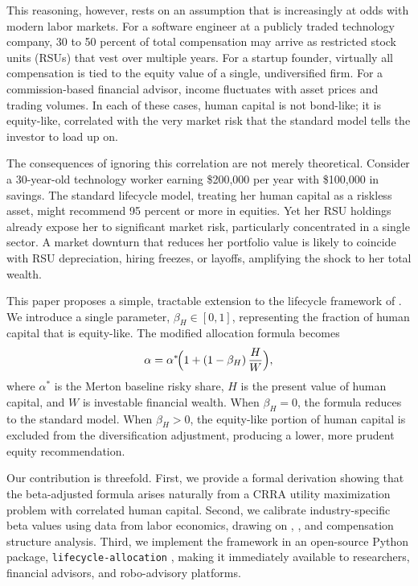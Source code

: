 \documentclass[11pt]{article}
\begin{document}
This reasoning, however, rests on an assumption that is increasingly at
odds with modern labor markets. For a software engineer at a publicly
traded technology company, 30 to 50 percent of total compensation may
arrive as restricted stock units (RSUs) that vest over multiple years. For
a startup founder, virtually all compensation is tied to the equity value
of a single, undiversified firm. For a commission-based financial advisor,
income fluctuates with asset prices and trading volumes. In each of these
cases, human capital is not bond-like; it is equity-like, correlated with
the very market risk that the standard model tells the investor to load up
on.

The consequences of ignoring this correlation are not merely theoretical.
Consider a 30-year-old technology worker earning \$200{,}000 per year with
\$100{,}000 in savings. The standard lifecycle model, treating her human
capital as a riskless asset, might recommend 95 percent or more in equities.
Yet her RSU holdings already expose her to significant market risk,
particularly concentrated in a single sector. A market downturn that
reduces her portfolio value is likely to coincide with RSU depreciation,
hiring freezes, or layoffs, amplifying the shock to her total wealth.

This paper proposes a simple, tractable extension to the lifecycle
framework of \citet{choi2025}. We introduce a single parameter,
$\beta_H \in [0,1]$, representing the fraction of human capital that is
equity-like. The modified allocation formula becomes
\begin{equation}\label{eq:main}
  \alpha = \alpha^{*}\!\Bigl(1 + (1 - \beta_H)\,\frac{H}{W}\Bigr),
\end{equation}
where $\alpha^{*}$ is the Merton baseline risky share, $H$ is the present
value of human capital, and $W$ is investable financial wealth. When
$\beta_H = 0$, the formula reduces to the standard model. When
$\beta_H > 0$, the equity-like portion of human capital is excluded from
the diversification adjustment, producing a lower, more prudent equity
recommendation.

Our contribution is threefold. First, we provide a formal derivation
showing that the beta-adjusted formula arises naturally from a CRRA utility
maximization problem with correlated human capital. Second, we calibrate
industry-specific beta values using data from labor economics, drawing on
\citet{davis2000}, \citet{benzoni2007}, and compensation structure
analysis. Third, we implement the framework in an open-source Python
package, \texttt{lifecycle-allocation} \citep{lifecycle_allocation}, making
it immediately available to researchers, financial advisors, and
robo-advisory platforms.
\end{document}
